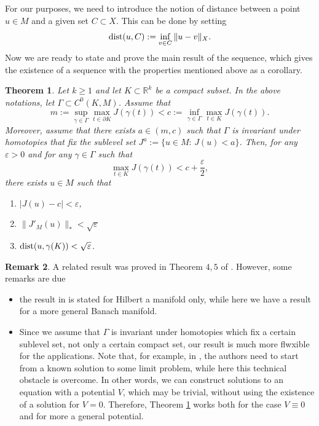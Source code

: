 \documentclass[11pt,reqno]{amsart}
\newtheorem{theorem}{Theorem}
\theoremstyle{definition}
\newtheorem{remark}[theorem]{Remark}
\numberwithin{equation}{section}
\numberwithin{theorem}{section}
\numberwithin{equation}{section}
\numberwithin{theorem}{section}
\newcommand{\R}{\mathbb{R}}
\begin{document}
For our purposes, we need to introduce the notion of distance between a point $u\in M$ and a given set $C\subset X$. This can be done by setting $${\rm dist}(u,C):=\inf_{v\in C}\|u-v\|_X.$$
Now we are ready to state and prove the main result of the sequence, which gives the existence of a sequence with the properties mentioned above as a corollary.
\begin{theorem}\label{th-bd-PS}
Let $k\ge 1$ and let $K\subset\R^k$ be a compact subset. In the above notations, let $\Gamma\subset C^0(K,M)$. Assume that
\begin{equation}\label{MP-geom-J}
m:=\sup_{\gamma\in\Gamma}\max_{t\in \partial K} J(\gamma(t))<c:=\inf_{\gamma\in\Gamma}\max_{t\in K}J(\gamma(t)).  
\end{equation}
Moreover, assume that there exists $a\in(m,c)$ such that $\Gamma$ is invariant under homotopies that fix the sublevel set $J^a:=\{u\in M:\,J(u)<a\}$. Then, for any $\varepsilon>0$ and for any $\gamma\in\Gamma$ such that 
\begin{equation}\label{min-seq}
\max_{t\in K}J(\gamma(t))<c+\frac{\varepsilon}{2},   
\end{equation}  
there exists $u\in M$ such that 
\begin{enumerate}
    \item $|J(u)-c|<\varepsilon$,
    \item $\|J'_M(u)\|_\ast<\sqrt{\varepsilon}$
    \item ${\rm dist}(u,\gamma(K))<\sqrt{\varepsilon}$.
\end{enumerate}
\end{theorem}
\begin{remark}
A related result was proved in Theorem $4,5$ of \cite{ghoussoub1993duality}. However, some remarks are due
\begin{itemize}
\item the result in \cite{ghoussoub1993duality} is stated for Hilbert a manifold only, while here we have a result for a more general Banach manifold.
\item Since we assume that $\Gamma$ is invariant under homotopies which fix a certain sublevel set, not only a certain compact set, our result is much more flwxible for the applications. Note that, for example, in \cite{bartsch2021normalized}, the authors need to start from a known solution to some limit problem, while here this technical obstacle is overcome. In other words, we can construct solutions to an equation with a potential $V$, which may be trivial, without using the existence of a solution for $V=0$. Therefore, Theorem \ref{th-bd-PS} works both for the case $V\equiv 0$ and for more a general potential.
\end{itemize}
\end{remark}
\end{document}
